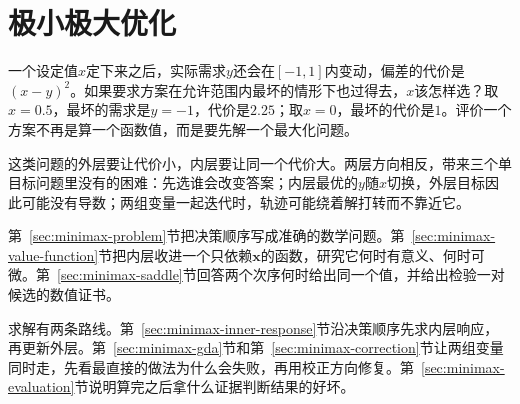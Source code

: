 \chapter{极小极大优化}
\label{chap:minimax-optimization}

一个设定值$x$定下来之后，实际需求$y$还会在$[-1,1]$内变动，偏差的代价是$(x-y)^2$。如果要求方案在允许范围内最坏的情形下也过得去，$x$该怎样选？取$x=0.5$，最坏的需求是$y=-1$，代价是$2.25$；取$x=0$，最坏的代价是$1$。评价一个方案不再是算一个函数值，而是要先解一个最大化问题。

这类问题的外层要让代价小，内层要让同一个代价大。两层方向相反，带来三个单目标问题里没有的困难：先选谁会改变答案；内层最优的$y$随$x$切换，外层目标因此可能没有导数；两组变量一起迭代时，轨迹可能绕着解打转而不靠近它。

第~\ref{sec:minimax-problem}节把决策顺序写成准确的数学问题。第~\ref{sec:minimax-value-function}节把内层收进一个只依赖$\bm{x}$的函数，研究它何时有意义、何时可微。第~\ref{sec:minimax-saddle}节回答两个次序何时给出同一个值，并给出检验一对候选的数值证书。

求解有两条路线。第~\ref{sec:minimax-inner-response}节沿决策顺序先求内层响应，再更新外层。第~\ref{sec:minimax-gda}节和第~\ref{sec:minimax-correction}节让两组变量同时走，先看最直接的做法为什么会失败，再用校正方向修复。第~\ref{sec:minimax-evaluation}节说明算完之后拿什么证据判断结果的好坏。









